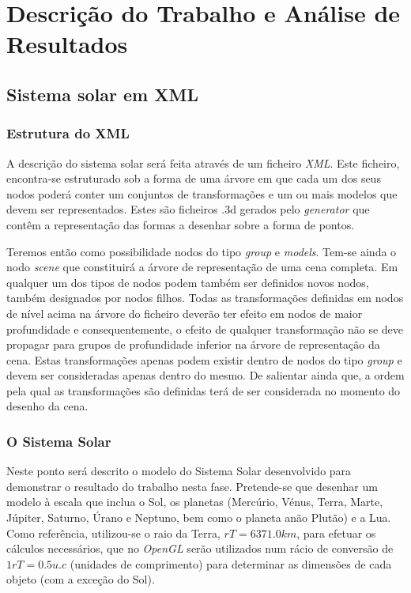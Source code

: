 \documentclass[a4paper]{article}
\begin{document}
\section{Descrição do Trabalho e Análise de Resultados}

\subsection{Sistema solar em XML} 

\subsubsection{Estrutura do XML}

\hspace{3mm} A descrição do sistema solar será feita através de um ficheiro \emph{XML}. Este ficheiro, encontra-se estruturado sob a forma de uma árvore em que cada um dos seus nodos poderá conter um conjuntos de transformações e um ou mais modelos que devem ser representados. Estes são ficheiros .3d gerados pelo \emph{generator} que contêm a representação das formas a desenhar sobre a forma de pontos.

\par Teremos então como possibilidade nodos do tipo \emph{group} e \emph{models}. Tem-se ainda o nodo \emph{scene} que constituirá a árvore de representação de uma cena completa. Em qualquer um dos tipos de nodos podem também ser definidos novos nodos, também designados por nodos filhos. Todas as transformações definidas em nodos de nível acima na árvore do ficheiro deverão ter efeito em nodos de maior profundidade e consequentemente, o efeito de qualquer transformação não se deve propagar para grupos de profundidade inferior na árvore de representação da cena. Estas transformações apenas podem existir dentro de nodos do tipo \emph{group} e devem ser consideradas apenas dentro do mesmo. De salientar ainda que, a ordem pela qual as transformações são definidas terá de ser considerada no momento do desenho da cena.

\pagebreak
\subsubsection{O Sistema Solar}

\hspace{3mm} Neste ponto será descrito o modelo do Sistema Solar desenvolvido para demonstrar o resultado do trabalho nesta fase. Pretende-se que desenhar um modelo à escala que inclua o Sol\cite{sun}, os planetas (Mercúrio\cite{mercury}, Vénus\cite{venus}, Terra\cite{earth}, Marte\cite{mars}, Júpiter\cite{jupiter}, Saturno\cite{saturn}, Úrano\cite{uranus} e Neptuno\cite{neptune}, bem como o planeta anão Plutão\cite{pluto}) e a Lua\cite{moon}. Como referência, utilizou-se o raio da Terra, $rT = 6371.0 km$, para efetuar os cálculos necessários, que no \textit{OpenGL} serão utilizados num rácio de conversão de $1 rT = 0.5 u.c$ (unidades de comprimento) para determinar as dimensões de cada objeto (com a exceção do Sol). 
\end{document}

